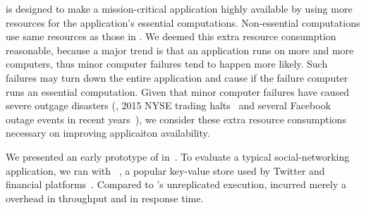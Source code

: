  \tripod is designed to make a
mission-critical application highly available by using  more 
resources for the application's essential computations. Non-essential 
computations use same resources as those in \mesos. We deemed this 
extra resource consumption reasonable, because a major trend is that an 
application runs on more and more computers, thus minor computer failures tend 
to happen more likely. Such failures may turn down the entire application and 
cause if the failure computer runs an essential computation. Given that minor 
computer failures have caused severe outgage disasters  (\eg, 2015 NYSE trading 
halts~\cite{nyse:halt} and several Facebook outage events in recent 
years~\cite{facebook:outage}), we consider these extra resource consumptions 
necessary on improving applicaiton availability.





 We presented an early prototype of \tripod
in~\cite{tripod:apsys16}. To evaluate a typical social-networking application, 
we ran \tripod with \memcached~\cite{memcached}, a popular key-value store used 
by Twitter and financial platforms~\cite{nosql:finance}. Compared to 
\memcached's unreplicated execution, \tripod incurred merely a \tputoverhead 
overhead in throughput and \latencyoverhead in response time.

